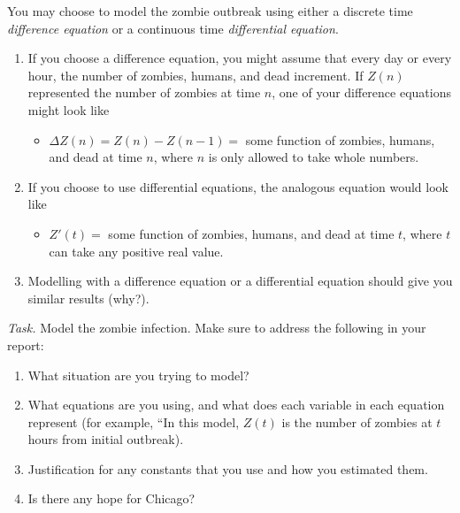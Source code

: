 
\begin{graybox}
You may choose to model the zombie outbreak using either a discrete time \emph{difference equation} or a continuous time \emph{differential equation}.
	\begin{enumerate}[label=\emph{(\alph*)}]
		\item If you choose a difference equation, you might assume that every day or every hour, the number of zombies, humans, and dead increment.  If $Z(n)$ represented the number of zombies at time $n$, one of your difference equations might look like
\begin{itemize}
	\item $\Delta Z(n) = Z(n) - Z(n-1) =$ some function of zombies, humans, and dead at time $n$,
	where $n$ is only allowed to take whole numbers.
\end{itemize}

	\item If you choose to use differential equations, the analogous equation would look like
\begin{itemize}
	\item $	Z'(t) = $ some function of zombies, humans, and dead at time $t$,
	where $t$ can take any positive real value.  
\end{itemize}

	\item Modelling with a difference equation or a differential equation should give you similar results (why?).
	\end{enumerate}
	
\end{graybox}

\emph{Task.} Model the zombie infection. Make sure to address the following in your report:
	\begin{enumerate}[label=\emph{(\alph*)}]
		\item What situation are you trying to model?
		\item What equations are you using, and what does each variable in each equation represent
			(for example, ``In this model, $Z(t)$ is the number of zombies at $t$ hours from initial outbreak).
		\item Justification for any constants that you use and how you estimated them.
		\item Is there any hope for Chicago?
	\end{enumerate}


